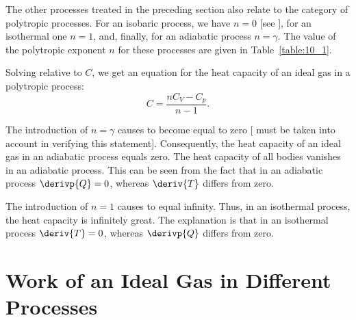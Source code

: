 The other processes treated in the preceding section also relate to the category of polytropic processes. For an isobaric process, we have $n=0$ [see ], for an isothermal one $n=1$, and, finally, for an adiabatic process $n=\gamma$. The value of the polytropic exponent $n$ for these processes are given in Table~\ref{table:10_1}.

\begin{table}[!htb]
	\renewcommand{\arraystretch}{1.2}
	\caption{ }
	\vspace{-0.6cm}
	\label{table:10_1}
	\begin{center}\end{center}
\end{table}

Solving  relative to $C$, we get an equation for the heat capacity of an ideal gas in a polytropic process:
\begin{equation}\label{eq:10_52}
	C = \frac{n C_V - C_p}{n - 1}.
\end{equation}

\noindent
The introduction of $n=\gamma$ causes  to become equal to zero [ must be taken into account in verifying this statement]. Consequently, the heat capacity of an ideal gas in an adiabatic process equals zero. The heat capacity of all bodies vanishes in an adiabatic process. This can be seen from the fact that in an adiabatic process $\derivp{Q}=0$, whereas $\deriv{T}$ differs from zero.

The introduction of $n=1$ causes  to equal infinity. Thus, in an isothermal process, the heat capacity is infinitely great. The explanation is that in an isothermal process $\deriv{T}=0$, whereas $\derivp{Q}$ differs from zero.

\section{Work of an Ideal Gas in Different Processes}\label{sec:10_12}

